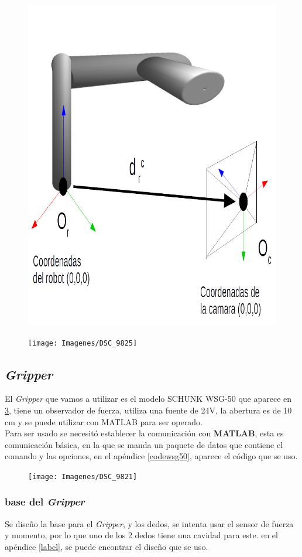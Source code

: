 \begin{figure}
	\centering
	\includegraphics[width=0.5\linewidth]{visio/visio3/coordenadasrobcam2}
	\caption{}
	\label{fig:coordenadasrobcam}
\end{figure}


\begin{figure}
	\centering
	\texttt{[image: Imagenes/DSC\_9825]}
	\caption{}
	\label{fig:dsc9825}
\end{figure}



\subsection{\textit{Gripper}}
El \textit{Gripper} que vamos a utilizar es el modelo SCHUNK WSG-50 que aparece en \cref{fig:dsc9821}, tiene un observador de fuerza, utiliza una fuente de 24V, la abertura es de 10 cm y se puede utilizar con MATLAB para ser operado. \\
Para ser usado se necesitó establecer la comunicación con \textbf{MATLAB}, esta es comunicación básica, en la que se manda un paquete de datos que contiene el comando y las opciones, en el apéndice \ref{codewsg50}, aparece el código que se uso.

\begin{figure}
	\centering
	\texttt{[image: Imagenes/DSC\_9821]}
	\caption{}
	\label{fig:dsc9821}
\end{figure}

\subsubsection{base del \textit{Gripper}}
Se diseño la base para el \textit{Gripper}, y los dedos, se intenta usar el sensor de fuerza y momento, por lo que uno de los 2 dedos tiene una cavidad para este. en el apéndice \ref{label}, se puede encontrar el diseño que se uso.

